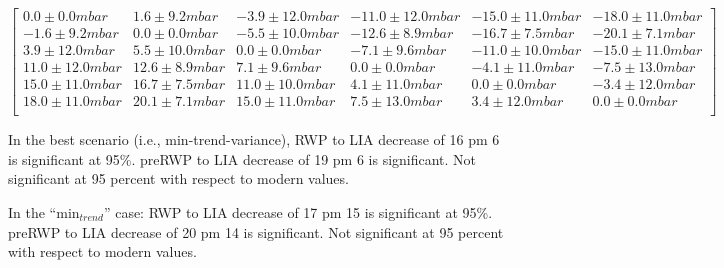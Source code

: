 \documentclass[12pt]{article}
\begin{document}
\begin{equation}
\left[
\begin{array}{cccccc}
0.0 ± 0.0 mbar & 1.6 ± 9.2 mbar & -3.9 ± 12.0 mbar & -11.0 ± 12.0 mbar & -15.0 ± 11.0 mbar & -18.0 ± 11.0 mbar \\
-1.6 ± 9.2 mbar & 0.0 ± 0.0 mbar & -5.5 ± 10.0 mbar & -12.6 ± 8.9 mbar & -16.7 ± 7.5 mbar & -20.1 ± 7.1 mbar \\
3.9 ± 12.0 mbar & 5.5 ± 10.0 mbar & 0.0 ± 0.0 mbar & -7.1 ± 9.6 mbar & -11.0 ± 10.0 mbar & -15.0 ± 11.0 mbar \\
11.0 ± 12.0 mbar & 12.6 ± 8.9 mbar & 7.1 ± 9.6 mbar & 0.0 ± 0.0 mbar & -4.1 ± 11.0 mbar & -7.5 ± 13.0 mbar \\
15.0 ± 11.0 mbar & 16.7 ± 7.5 mbar & 11.0 ± 10.0 mbar & 4.1 ± 11.0 mbar & 0.0 ± 0.0 mbar & -3.4 ± 12.0 mbar \\
18.0 ± 11.0 mbar & 20.1 ± 7.1 mbar & 15.0 ± 11.0 mbar & 7.5 ± 13.0 mbar & 3.4 ± 12.0 mbar & 0.0 ± 0.0 mbar \\
\end{array}
\right]
\end{equation}

In the best scenario (i.e., min-trend-variance),
RWP to LIA decrease of 16 pm 6 is significant at 95\%.
preRWP to LIA decrease of 19 pm 6 is significant.
Not significant at 95 percent with respect to modern values.

In the ``min$_{trend}$'' case:
RWP to LIA decrease of 17 pm 15 is significant at 95\%.
preRWP to LIA decrease of 20 pm 14 is significant.
Not significant at 95 percent with respect to modern values.



\end{document}
